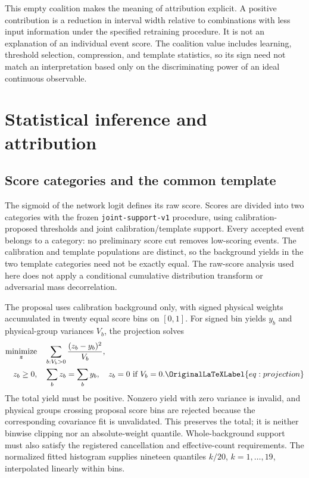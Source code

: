 \documentclass[aps,prd,reprint,superscriptaddress,nofootinbib,longbibliography,floatfix]{revtex4-2}
\let\label\OriginalLaTeXLabel
\begin{document}
This empty coalition makes the meaning of attribution explicit. A positive
contribution is a reduction in interval width relative to combinations with
less input information under the specified retraining procedure. It is not
an explanation of an individual event score. The coalition value includes
learning, threshold selection, compression, and template statistics, so its
sign need not match an interpretation based only on the discriminating power
of an ideal continuous observable.

\section{Statistical inference and attribution}
\label{sec:inference}

\subsection{Score categories and the common template}

The sigmoid of the network logit defines its raw score. Scores are divided
into two categories with the frozen \texttt{joint-support-v1} procedure,
using calibration-proposed thresholds and joint calibration/template support.
Every accepted
event belongs to a category: no preliminary score cut removes low-scoring
events. The calibration and template populations are distinct, so the
background yields in the two template categories need not be exactly equal.
The raw-score analysis used here does not apply a conditional cumulative
distribution transform or adversarial mass decorrelation.

The proposal uses calibration background only, with signed physical weights
accumulated in twenty equal score bins on $[0,1]$. For signed bin yields
$y_b$ and physical-group variances $V_b$, the projection solves
\begin{align}
 \underset{\bm z}{\operatorname{minimize}}\quad&
       \sum_{b:V_b>0}\frac{(z_b-y_b)^2}{V_b},\nonumber\\
 z_b\geq0,\quad&\sum_b z_b=\sum_b y_b,\quad
                  z_b=0\ \text{if }V_b=0.
 \label{eq:projection}
\end{align}
The total yield must be positive. Nonzero yield with zero variance is
invalid, and physical groups crossing proposal score bins are rejected
because the corresponding covariance fit is unvalidated. This preserves
the total; it is neither binwise clipping nor an absolute-weight quantile.
Whole-background support must also satisfy the registered cancellation and
effective-count requirements. The normalized fitted histogram supplies
nineteen quantiles $k/20$, $k=1,\ldots,19$, interpolated linearly within bins.
\end{document}
